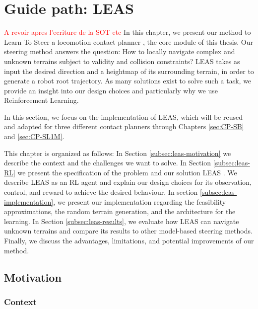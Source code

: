 


\chapter{Guide path: LEAS}
\label{sec:LEAS}
\minitoc
\bigskip

\textcolor{red}{A revoir apres l'ecriture de la SOT etc}
In this chapter, we present our method to Learn To Steer a locomotion contact planner , the core module of this thesis. 
Our steering method answers the question: How to locally navigate complex and unknown terrains subject to validity and collision constraints? 
LEAS takes as input the desired direction and a heightmap of its surrounding terrain, in order to generate a robot root trajectory.
As many solutions exist to solve such a task, we provide an insight into our design choices and particularly why we use Reinforcement Learning.

In this section, we focus on the implementation of LEAS, which will be reused and adapted for three different contact planners through Chapters \ref{sec:CP-SB} and \ref{sec:CP-SL1M}.

This chapter is organized as follows: 
In Section \ref{subsec:leas-motivation} we describe the context and the challenges we want to solve. In Section \ref{subsec:leas-RL} we present the specification of the problem and our solution LEAS \cite{LEAS}. We describe LEAS as an RL agent and explain our design choices for its observation, control, and reward to achieve the desired behaviour.
In section \ref{subsec:leas-implementation}, we present our implementation regarding the feasibility approximations, the random terrain generation, and the architecture for the learning.
In Section \ref{subsec:leas-results}, we evaluate how LEAS can navigate unknown terrains and compare its results to other model-based steering methods.
Finally, we discuss the advantages, limitations, and potential improvements of our method.

\section{Motivation\label{subsec:leas-motivation}}
\subsection{Context\label{subsubsec:context}}

